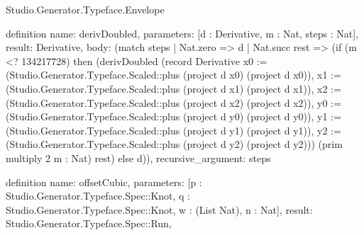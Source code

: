 \begin{lexlean}{Studio.Generator.Typeface.Envelope}
\begin{semanticmodule}
definition{
  name: derivDoubled,
  parameters: [d : Derivative, m : Nat, steps : Nat],
  result: Derivative,
  body: (match steps
    | Nat.zero => d
    | Nat.succ rest => (if (m <? 134217728) then (derivDoubled (record Derivative {x0 := (Studio.Generator.Typeface.Scaled::plus (project d x0) (project d x0)), x1 := (Studio.Generator.Typeface.Scaled::plus (project d x1) (project d x1)), x2 := (Studio.Generator.Typeface.Scaled::plus (project d x2) (project d x2)), y0 := (Studio.Generator.Typeface.Scaled::plus (project d y0) (project d y0)), y1 := (Studio.Generator.Typeface.Scaled::plus (project d y1) (project d y1)), y2 := (Studio.Generator.Typeface.Scaled::plus (project d y2) (project d y2))}) (prim multiply 2 m : Nat) rest) else d)),
  recursive_argument: steps
}

definition{
  name: offsetCubic,
  parameters: [p : Studio.Generator.Typeface.Spec::Knot, q : Studio.Generator.Typeface.Spec::Knot, w : (List Nat), n : Nat],
  result: Studio.Generator.Typeface.Spec::Run,
}
\end{semanticmodule}
\end{lexlean}
